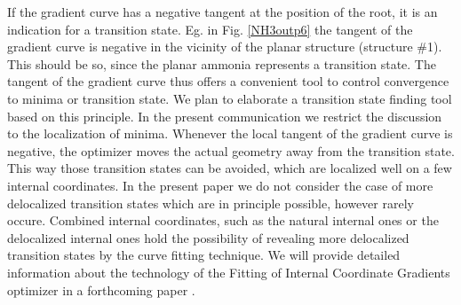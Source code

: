 \documentclass[prl,aps,twocolumn,showpacs,twocolumngrid,superbib]{revtex4}
\begin{document}
If the gradient curve has a negative tangent at the position
of the root, it is an indication for a transition state. 
Eg. in Fig. \ref{NH3outp6}
the tangent of the gradient curve is negative 
in the vicinity of the planar
structure (structure \#1). This should be so, since the planar
ammonia represents a transition state. The tangent of the gradient 
curve thus offers a
convenient tool to control convergence to minima or transition state.
We plan to elaborate a transition state finding tool based on this 
principle. In the present communication we restrict the discussion
to the localization of minima. Whenever the local tangent  
of the gradient curve
is negative, the optimizer moves the actual geometry away from 
the transition state. This way those transition states 
can be avoided, which are localized well on a few internal coordinates. 
In the present paper we do not consider the case of more 
delocalized transition states which are in principle possible,
however rarely occure. Combined internal coordinates, such
as the natural internal ones \cite{Pulay_natural_internals} or the
delocalized internal ones \cite{Baker_deloc_1} hold the possibility
of revealing more delocalized transition states by the
curve fitting technique.
%
%
We will provide detailed information about the technology of 
the Fitting of Internal Coordinate Gradients
optimizer in a forthcoming paper \cite{bisect-paper}.
\end{document}
